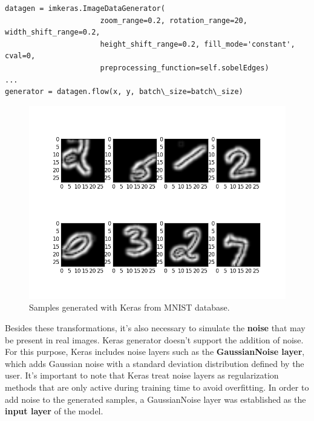 \begin{lstlisting}
datagen = imkeras.ImageDataGenerator(
	                  zoom_range=0.2, rotation_range=20, width_shift_range=0.2, 
	                  height_shift_range=0.2, fill_mode='constant', cval=0,
	                  preprocessing_function=self.sobelEdges)
...	              
generator = datagen.flow(x, y, batch\_size=batch\_size)
\end{lstlisting}

\begin{figure}
	\centering
	\includegraphics[width=12cm, keepaspectratio]{figures/aug_keras.png}
	\caption{Samples generated with Keras from MNIST database.}
	\label{fig:aug_keras}
\end{figure}

Besides these transformations, it's also necessary to simulate the \textbf{noise} that may be present in real images. Keras generator doesn't support the addition of noise. For this purpose, Keras includes noise layers such as the \textbf{GaussianNoise layer}, which adds Gaussian noise with a standard deviation distribution defined by the user. It's important to note that Keras treat noise layers as regularization methods that are only active during training time to avoid overfitting. In order to add noise to the generated samples, a GaussianNoise layer was established as the \textbf{input layer} of the model.

